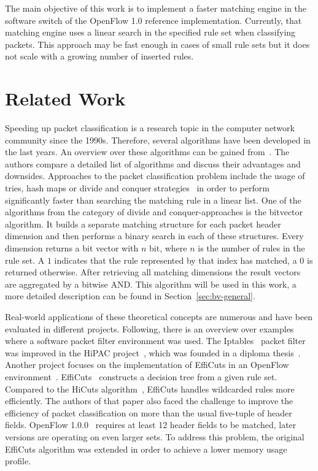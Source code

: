 \documentclass[a4paper,
		12pt,
		parskip=full,
		titlepage
		]{scrartcl}
\begin{document}
The main objective of this work is to implement a faster matching engine in the software switch of the OpenFlow 1.0 reference implementation.
Currently, that matching engine uses a linear search in the specified rule set when classifying packets.
This approach may be fast enough in cases of small rule sets but it does not scale
with a growing number of inserted rules.

\section{Related Work}
Speeding up packet classification is a research topic in the computer network community since the 1990s.
Therefore, several algorithms have been developed in the last years.
An overview over these algorithms can be gained from~\cite{algorithms_survey}.
The authors compare a detailed list of algorithms and discuss their advantages and downsides.
Approaches to the packet classification problem include the usage of tries, 
hash maps or divide and conquer strategies~\cite{hicuts, efficuts} in order to perform significantly 
faster than searching the matching rule in a linear list.
One of the algorithms from the category of divide and conquer-approaches is the bitvector~\cite{bv} algorithm.
It builds a separate matching structure for each packet header dimension and 
then performs a binary search in each of these structures.
Every dimension returns a bit vector with $n$ bit, where $n$ is the number of rules in the rule set.
A $1$ indicates that the rule represented by that index has matched, a $0$ is returned otherwise.
After retrieving all matching dimensions the result vectors are aggregated by a bitwise AND.
This algorithm will be used in this work, a more detailed description can be found in Section~\ref{sec:bv-general}.

Real-world applications of these theoretical concepts are numerous and have been evaluated in different projects.
Following, there is an overview over examples where a software packet filter environment was used.
The Iptables~\cite{iptables} packet filter was improved in the HiPAC project~\cite{hipac}, 
which was founded in a diploma thesis~\cite{heinzhigh}. %
Another project focuses on the implementation of EffiCuts in an OpenFlow environment~\cite{stimpfling2013optimal}.
EffiCuts~\cite{efficuts} constructs a decision tree from a given rule set.
Compared to the HiCuts algorithm~\cite{hicuts}, EffiCuts handles wildcarded rules more efficiently.
The authors of that paper also faced the challenge to improve the efficiency 
of packet classification on more than the usual five-tuple of header fields.
OpenFlow 1.0.0~\cite{openflow_spec10} requires at least 12 header fields to be matched, later versions are operating on even larger sets.
To address this problem, the original EffiCuts algorithm was extended in order to achieve a lower memory usage profile.
\end{document}
